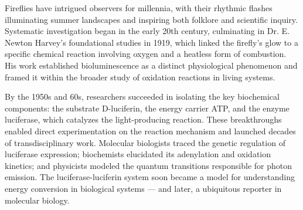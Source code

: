 \begin{historical}
Fireflies have intrigued observers for millennia, with their rhythmic flashes illuminating summer landscapes and inspiring both folklore and scientific inquiry. Systematic investigation began in the early 20th century, culminating in Dr. E. Newton Harvey’s foundational studies in 1919, which linked the firefly's glow to a specific chemical reaction involving oxygen and a heatless form of combustion. His work established bioluminescence as a distinct physiological phenomenon and framed it within the broader study of oxidation reactions in living systems.

By the 1950s and 60s, researchers succeeded in isolating the key biochemical components: the substrate D-luciferin, the energy carrier ATP, and the enzyme luciferase, which catalyzes the light-producing reaction. These breakthroughs enabled direct experimentation on the reaction mechanism and launched decades of transdisciplinary work. Molecular biologists traced the genetic regulation of luciferase expression; biochemists elucidated its adenylation and oxidation kinetics; and physicists modeled the quantum transitions responsible for photon emission. The luciferase-luciferin system soon became a model for understanding energy conversion in biological systems — and later, a ubiquitous reporter in molecular biology.
\end{historical}


